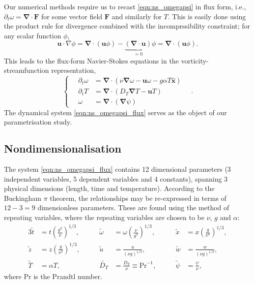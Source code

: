 \documentclass{article}
\renewcommand\vec{\bm}
\newcommand{\uvec}[1]{\vec{\hat{#1}}}
\newcommand{\grad}{\vec{\nabla}}
\newcommand{\prandtl}{\ensuremath{\mathrm{Pr}}}
\begin{document}
Our numerical methods require us to recast \autoref{eqn:ns_omegapsi} in flux
form, i.e., $\partial_t \omega = \grad \cdot \vec{F}$ for some vector field
$\vec{F}$ and similarly for $T$. This is easily done using the product
rule for divergence combined with the incomprssibility constraint;
for any scalar function $\phi$,
\[
    \vec{u} \cdot \nabla \phi = \grad \cdot (\vec{u} \phi)
        - \underbrace{(\grad \cdot \vec{u})}_{=0} \phi
        = \grad \cdot (\vec{u} \phi).
\]
This leads to the flux-form Navier-Stokes equations in the
vorticity-streamfunction representation,
\begin{equation} \label{eqn:ns_omegapsi_flux}
    \left\{ \quad
    \begin{aligned}
        \partial_t \omega &= \grad \cdot (\nu \grad \omega - \vec{u} \omega
            - g \alpha T \uvec{x}) \\
        \partial_t T &= \grad \cdot (D_T \grad T - \vec{u} T) \\
        \omega &= \grad \cdot (\grad \psi)
    \end{aligned}
    \right. \quad .
\end{equation}
The dynamical system \autoref{eqn:ns_omegapsi_flux} serves as the object of
our parametrisation study.

\subsection{Nondimensionalisation}
The system \autoref{eqn:ns_omegapsi_flux} contains 12 dimensional parameters
(3 independent variables, 5 dependent variables and 4 constants), spanning 3
physical dimensions (length, time and temperature). According to the
Buckingham $\pi$ theorem, the relationships may be re-expressed in terms of
$12-3=9$ dimensionless parameters. These are found using the method of
repeating variables, where the repeating variables are chosen to be
$\nu$, $g$ and $\alpha$:
\begin{alignat*}{3}
    \tilde{t} &= t \left( \frac{g^2}{\nu} \right)^{1/3},
        & \qquad \tilde{\omega} &= \omega \left( \frac{\nu}{g^2} \right)^{1/3},
        & \qquad \tilde{x} &= x \left( \frac{g}{\nu^2} \right)^{1/3}, \\
    \tilde{z} &= z \left( \frac{g}{\nu^2} \right)^{1/3},
        & \qquad \tilde{u} &= \frac{u}{(\nu g)^{1/3}},
        & \qquad \tilde{w} &= \frac{w}{(\nu g)^{1/3}}, \\
    \tilde{T} &= \alpha T,
        & \qquad \tilde{D_T} &= \frac{D_T}{\nu} \equiv \prandtl^{-1},
        & \qquad \tilde{\psi} &= \frac{\psi}{\nu},
\end{alignat*}
where $\prandtl$ is the Prandtl number.
\end{document}

